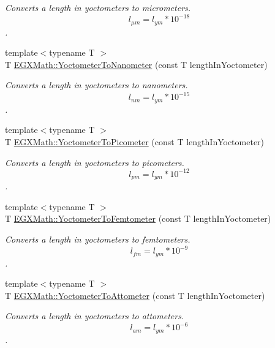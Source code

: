 \begin{DoxyCompactItemize}
\begin{DoxyCompactList}\small\item\em Converts a length in yoctometers to micrometers. \[ l_{\mu m}=l_{ym} * 10^{-18} \]. \end{DoxyCompactList}\item 
{\footnotesize template$<$typename T $>$ }\\T \mbox{\hyperlink{group___e_g_x_math-_conversions-_length_conversions-_s_i-_yoctometer-_s_i_ga209906b099f04d26a1487bedcac4f65d}{E\+G\+X\+Math\+::\+Yoctometer\+To\+Nanometer}} (const T length\+In\+Yoctometer)
\begin{DoxyCompactList}\small\item\em Converts a length in yoctometers to nanometers. \[ l_{nm}=l_{ym} * 10^{-15} \]. \end{DoxyCompactList}\item 
{\footnotesize template$<$typename T $>$ }\\T \mbox{\hyperlink{group___e_g_x_math-_conversions-_length_conversions-_s_i-_yoctometer-_s_i_gab621b78b78d6776131912bd6038901b9}{E\+G\+X\+Math\+::\+Yoctometer\+To\+Picometer}} (const T length\+In\+Yoctometer)
\begin{DoxyCompactList}\small\item\em Converts a length in yoctometers to picometers. \[ l_{pm}=l_{ym} * 10^{-12} \]. \end{DoxyCompactList}\item 
{\footnotesize template$<$typename T $>$ }\\T \mbox{\hyperlink{group___e_g_x_math-_conversions-_length_conversions-_s_i-_yoctometer-_s_i_ga2e4981232314be21ccfbe019886c5048}{E\+G\+X\+Math\+::\+Yoctometer\+To\+Femtometer}} (const T length\+In\+Yoctometer)
\begin{DoxyCompactList}\small\item\em Converts a length in yoctometers to femtometers. \[ l_{fm}=l_{ym} * 10^{-9} \]. \end{DoxyCompactList}\item 
{\footnotesize template$<$typename T $>$ }\\T \mbox{\hyperlink{group___e_g_x_math-_conversions-_length_conversions-_s_i-_yoctometer-_s_i_ga1c259ce5be00a40690fecbc2e71083fd}{E\+G\+X\+Math\+::\+Yoctometer\+To\+Attometer}} (const T length\+In\+Yoctometer)
\begin{DoxyCompactList}\small\item\em Converts a length in yoctometers to attometers. \[ l_{am}=l_{ym} * 10^{-6} \]. \end{DoxyCompactList}\item 

\end{DoxyCompactItemize}
